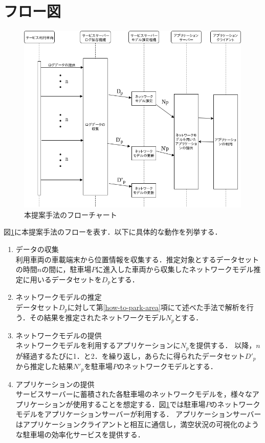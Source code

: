 \section{フロー図}
\begin{figure}
	\centering
	\includegraphics[width=14cm]{fig/flow_proposal.png}
	\caption{本提案手法のフローチャート}
	\label{flow_proposal}
\end{figure}
図\ref{flow_proposal}に本提案手法のフローを表す．以下に具体的な動作を列挙する．
\begin{enumerate}
	\item データの収集\\
	      利用車両の車載端末から位置情報を収集する．推定対象とするデータセットの時間$n$の間に，駐車場$P$に進入した車両から収集したネットワークモデル推定に用いるデータセットを$D_p$とする．
	\item ネットワークモデルの推定\\
	      データセット$D_p$に対して第\ref{how-to-park-area}項にて述べた手法で解析を行う．その結果を推定されたネットワークモデル$N_p$とする．
	\item ネットワークモデルの提供\\
	      ネットワークモデルを利用するアプリケーションに$N_p$を提供する．
	      以降，$n$が経過するたびに1．と2．を繰り返し，あらたに得られたデータセット$D'_p$から推定した結果$N'_p$を駐車場$P$のネットワークモデルとする．
	\item アプリケーションの提供\\
	      サービスサーバーに蓄積された各駐車場のネットワークモデルを，様々なアプリケーションが使用することを想定する．図\ref{flow_proposal}では駐車場$P$のネットワークモデルをアプリケーションサーバーが利用する． アプリケーションサーバーはアプリケーションクライアントと相互に通信し，満空状況の可視化のような駐車場の効率化サービスを提供する．
\end{enumerate}
